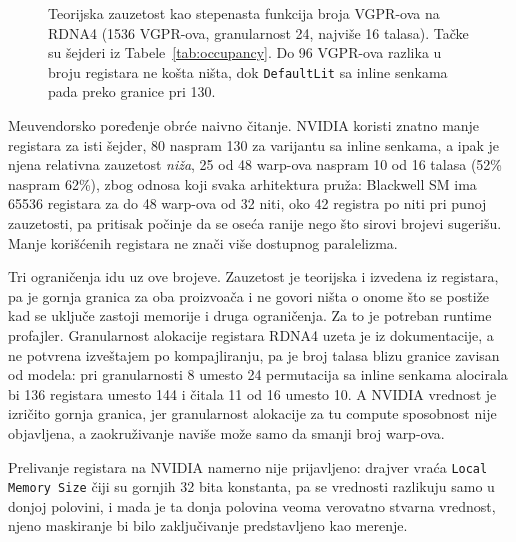 \begin{figure}[tbp]
\centering
{}
\caption[Zauzetost kao stepenasta funkcija broja VGPR-ova]{Teorijska zauzetost kao stepenasta funkcija broja
VGPR-ova na RDNA4 (1536 VGPR-ova, granularnost 24, najvi\v{s}e 16 talasa). Ta\v{c}ke su \v{s}ejderi iz
Tabele~\ref{tab:occupancy}. Do 96 VGPR-ova razlika u broju registara ne ko\v{s}ta ni\v{s}ta, dok
\texttt{DefaultLit} sa inline senkama pada preko granice pri 130.}
\label{fig:occupancy-cliff}
\end{figure}

Me\dj{}uvendorsko poređenje obr\'ce naivno \v{c}itanje. NVIDIA koristi znatno manje registara za
isti \v{s}ejder, 80 naspram 130 za varijantu sa inline senkama, a ipak je njena relativna zauzetost \emph{ni\v{z}a},
25 od 48 warp-ova naspram 10 od 16 talasa (52\% naspram 62\%), zbog odnosa koji svaka arhitektura
pru\v{z}a: Blackwell SM ima 65536 registara za do 48 warp-ova od 32 niti, oko 42 registra po
niti pri punoj zauzetosti, pa pritisak po\v{c}inje da se oseća ranije nego \v{s}to sirovi brojevi sugeri\v{s}u. Manje
kori\v{s}\'cenih registara ne zna\v{c}i vi\v{s}e dostupnog paralelizma.

Tri ograni\v{c}enja idu uz ove brojeve. Zauzetost je teorijska i izvedena iz registara, pa je
gornja granica za oba proizvo\dj a\v{c}a i ne govori ni\v{s}ta o onome \v{s}to se posti\v{z}e kad se uklju\v{c}e zastoji memorije i druga
ograni\v{c}enja. Za to je potreban runtime profajler. Granularnost alokacije registara RDNA4 uzeta je
iz dokumentacije, a ne potvr\dj ena izve\v{s}tajem po kompajliranju,
pa je broj talasa blizu granice zavisan od modela: pri granularnosti 8 umesto 24
permutacija sa inline senkama alocirala bi 136 registara umesto 144 i \v{c}itala 11 od 16 umesto
10. A NVIDIA vrednost je izri\v{c}ito
gornja granica, jer granularnost alokacije za tu compute sposobnost nije objavljena, a
zaokru\v{z}ivanje naviše mo\v{z}e samo da smanji broj warp-ova.

Prelivanje registara na NVIDIA namerno nije prijavljeno: drajver vra\'ca \texttt{Local Memory
Size} \v{c}iji su gornjih 32 bita konstanta, pa se vrednosti razlikuju samo u donjoj polovini, i mada je ta
donja polovina veoma verovatno stvarna vrednost, njeno maskiranje bi bilo zaklju\v{c}ivanje predstavljeno kao merenje.
